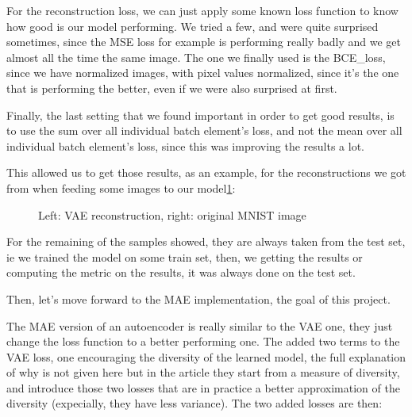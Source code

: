 \documentclass{article} %
\begin{document}
For the reconstruction loss, we can just apply some known loss function to know
how good is our model performing. We tried a few, and were quite surprised
sometimes, since the MSE loss for example is performing really badly and we get
almost all the time the same image. The one we finally used is the BCE\_loss,
since we have normalized images, with pixel values normalized, since it's the
one that is performing the better, even if we were also surprised at first.

Finally, the last setting that we found important in order to get good results,
is to use the sum over all individual batch element's loss, and not the mean
over all individual batch element's loss, since this was improving the results a
lot.

This allowed us to get those results, as an example, for the reconstructions we
got from when feeding some images to our model\ref{fig:vae}:

\begin{figure}%
  \centering
  \qquad
  \caption{Left: VAE reconstruction, right: original MNIST image}%
  \label{fig:vae}%
\end{figure}

For the remaining of the samples showed, they are always taken from the test
set, ie we trained the model on some train set, then, we getting the results or
computing the metric on the results, it was always done on the test set.

Then, let's move forward to the MAE implementation, the goal of this project.   

The MAE version of an autoencoder is really similar to the VAE one, they just
change the loss function to a better performing one. The added two terms to the
VAE loss, one encouraging the diversity of the learned model, the full
explanation of why is not given here but in the article they start from a
measure of diversity, and introduce those two losses that are in practice a
better approximation of the diversity (expecially, they have less variance). The
two added losses are then:
\end{document}
